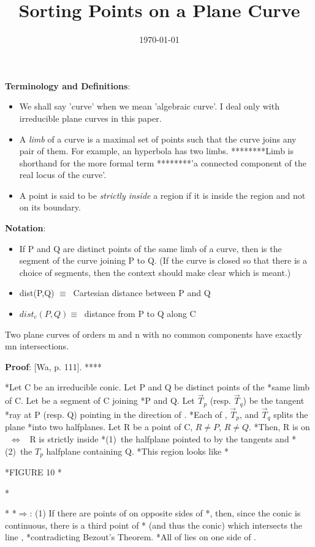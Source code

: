 \title{Sorting Points on a Plane Curve} %
\date{\today}
\author{}
\maketitle
%
{\bf Terminology and Definitions}:
\begin{itemize}
\item
    We shall say 'curve' when we mean 'algebraic curve'.
I deal only with irreducible plane curves in this paper.
\item
    A {\em limb} of a curve is a maximal set of points
such that the curve joins any pair of them.  For example, an hyperbola has two limbs.
********Limb is shorthand for the more formal term
********'a connected component of the real locus of the curve'.
\item
    A point is said to be {\em strictly inside} a region if it is inside
the region and not on its boundary.
\end{itemize}
{\bf Notation}:
\begin{itemize}
   \item If P and Q are distinct points of the same limb of a curve,
then  is the segment of the curve joining P to Q.  (If the curve
is closed so that there is a choice of segments, then the context should 
make clear which is meant.)
    \item dist(P,Q) $\equiv \ $ Cartesian distance between P and Q
    \item $dist_{c}(P,Q) \equiv\ $ distance from P to Q along C
\end{itemize}
\begin{theorem}[Bezout]\nopagebreak
Two plane curves of orders m and n with no common components have
exactly mn intersections.
\end{theorem}
{\bf Proof}: [Wa, p. 111].
****\begin{lemma}\nopagebreak
*Let C be an irreducible conic.  Let P and Q be distinct points of the 
*same limb of C.  Let  be a segment of C joining
*P and Q.  Let $\vec{T}_{p}$ (resp. $\vec{T}_{q}$) be the tangent
*ray at P (resp. Q) pointing in the direction of .
*Each of , $\vec{T}_{p}$, and $\vec{T}_{q}$ splits the plane
*into two halfplanes.  Let R be a point of C, $R \neq P$, $R \neq Q$.
*Then, R is on  \ $\Leftrightarrow$ \  R is strictly inside
*(1)~the  halfplane pointed to by the tangents and
*(2)~the $T_{p}$ halfplane containing Q.
*This region looks like
*\begin{center}
*FIGURE 10
*\end{center}
*\end{lemma}
*\proof
*$\Rightarrow$: (1) If there are points of  on opposite sides of
*, then, since the conic is continuous, there is a third point of
* (and thus the conic) which intersects the line ,
*contradicting Bezout's Theorem.
*\hence All of  lies on one side of .

